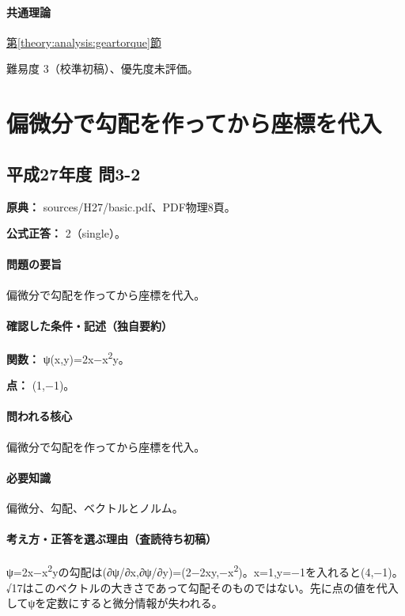 \paragraph{共通理論} \hyperref[theory:analysis:geartorque]{第\ref*{theory:analysis:geartorque}節}

\par 難易度 3（校準初稿）、優先度未評価。

\section{偏微分で勾配を作ってから座標を代入}

\subsection{平成27年度 問3-2}
\label{q:h27-reg-basic-3-2}

\noindent\textbf{原典：} sources/H27/basic.pdf、PDF物理8頁。

\textbf{公式正答：} 2（single）。

\paragraph{問題の要旨} 偏微分で勾配を作ってから座標を代入。

\paragraph{確認した条件・記述（独自要約）}\mbox{}\par

\noindent\textbf{関数：} ψ(x,y)=\allowbreak{}2x−x\textsuperscript{2}y。\par

\noindent\textbf{点：} (1,−1)。\par

\paragraph{問われる核心} 偏微分で勾配を作ってから座標を代入。

\paragraph{必要知識} 偏微分、勾配、ベクトルとノルム。

\paragraph{考え方・正答を選ぶ理由（査読待ち初稿）} ψ=2x−x\textsuperscript{2}yの勾配は(∂ψ/∂x,∂ψ/∂y)=\allowbreak{}(2−2xy,−x\textsuperscript{2})。x=\allowbreak{}1,y=−1を入れると(4,−1)。√17はこのベクトルの大きさであって勾配そのものではない。先に点の値を代入してψを定数にすると微分情報が失われる。

